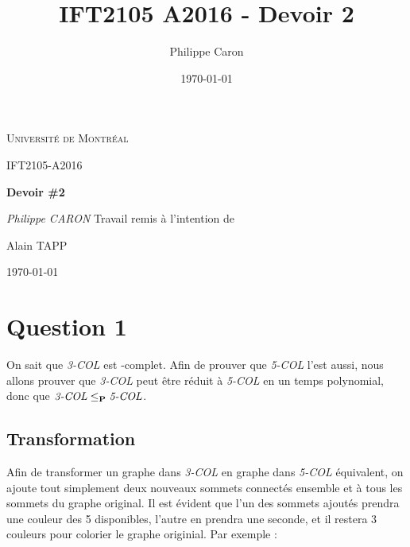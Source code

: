 \documentclass{article}
\title{IFT2105 A2016 - Devoir 2}
\author{Philippe Caron}
\date{\today}
\newcommand\NP{{\normalfont{\textbf{NP}}}}
\newcommand\PP{{\normalfont{\textbf{P}}}}
\newcommand\col[1]{\textit{#1-COL}}
\begin{document}
\begin{titlepage}
  \centering
	{\scshape\LARGE Université de Montréal \par}
	\vspace{7cm}
	{\scshape\Large IFT2105-A2016\par}
	\vspace{1cm}
	{\huge\bfseries Devoir \#2\par}
	\vspace{1cm}
	       {\Large\itshape Philippe CARON}
	\vfill
	Travail remis à l'intention de\par
	Alain TAPP
        \vspace{2cm}

	\vfill
	{\large \today\par}
\end{titlepage}

\tableofcontents

\pagebreak

\section{Question 1}
On sait que \col{3} est \NP-complet. Afin de prouver que \col{5} l'est aussi, nous allons prouver que \col{3} peut être réduit à \col{5} en un temps polynomial, donc que $\col{3} \leq_\PP \col{5}$.

\subsection{Transformation}
Afin de transformer un graphe dans \col{3} en graphe dans \col{5} équivalent, on ajoute tout simplement deux nouveaux sommets connectés ensemble et à tous les sommets du graphe original. Il est évident que l'un des sommets ajoutés prendra une couleur des 5 disponibles, l'autre en prendra une seconde, et il restera 3 couleurs pour colorier le graphe originial. Par exemple :
\end{document}
